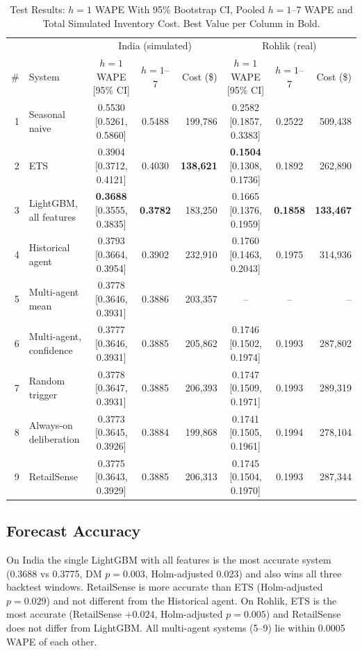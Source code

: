 \documentclass[conference]{IEEEtran}
\begin{document}
\begin{table}[t]
\caption{Test Results: $h=1$ WAPE With 95\% Bootstrap CI, Pooled $h=1$--7 WAPE and Total Simulated Inventory Cost. Best Value per Column in Bold.}
\label{tab:results}
\centering
\scriptsize
\setlength{\tabcolsep}{4pt}
\begin{tabular}{@{}rl ccr ccr@{}}
\toprule
 & & \multicolumn{3}{c}{India (simulated)} & \multicolumn{3}{c}{Rohlik (real)} \\
\cmidrule(lr){3-5}\cmidrule(l){6-8}
\# & System & $h=1$ WAPE [95\% CI] & $h=1$--7 & Cost (\$) & $h=1$ WAPE [95\% CI] & $h=1$--7 & Cost (\$) \\
\midrule
1 & Seasonal naive          & 0.5530 [0.5261, 0.5860] & 0.5488 & 199,786 & 0.2582 [0.1857, 0.3383] & 0.2522 & 509,438 \\
2 & ETS                     & 0.3904 [0.3712, 0.4121] & 0.4030 & \textbf{138,621} & \textbf{0.1504} [0.1308, 0.1736] & 0.1892 & 262,890 \\
3 & LightGBM, all features  & \textbf{0.3688} [0.3555, 0.3835] & \textbf{0.3782} & 183,250 & 0.1665 [0.1376, 0.1959] & \textbf{0.1858} & \textbf{133,467} \\
4 & Historical agent        & 0.3793 [0.3664, 0.3954] & 0.3902 & 232,910 & 0.1760 [0.1463, 0.2043] & 0.1975 & 314,936 \\
5 & Multi-agent mean        & 0.3778 [0.3646, 0.3931] & 0.3886 & 203,357 & -- & -- & -- \\
6 & Multi-agent, confidence & 0.3777 [0.3646, 0.3931] & 0.3885 & 205,862 & 0.1746 [0.1502, 0.1974] & 0.1993 & 287,802 \\
7 & Random trigger          & 0.3778 [0.3647, 0.3931] & 0.3885 & 206,393 & 0.1747 [0.1509, 0.1971] & 0.1993 & 289,319 \\
8 & Always-on deliberation  & 0.3773 [0.3645, 0.3926] & 0.3884 & 199,868 & 0.1741 [0.1505, 0.1961] & 0.1994 & 278,104 \\
9 & RetailSense             & 0.3775 [0.3643, 0.3929] & 0.3885 & 206,313 & 0.1745 [0.1504, 0.1970] & 0.1993 & 287,344 \\
\bottomrule
\end{tabular}
\end{table}

\subsection{Forecast Accuracy}
On India the single LightGBM with all features is the most accurate system (0.3688 vs 0.3775,
DM $p=0.003$, Holm-adjusted 0.023) and also wins all three backtest windows. RetailSense is more
accurate than ETS (Holm-adjusted $p=0.029$) and not different from the Historical agent. On Rohlik,
ETS is the most accurate (RetailSense $+0.024$, Holm-adjusted $p=0.005$) and RetailSense does not
differ from LightGBM. All multi-agent systems (5--9) lie within 0.0005 WAPE of each other.
\end{document}
